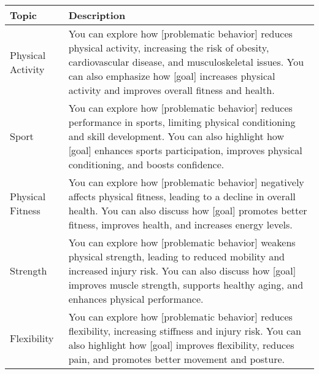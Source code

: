 \begin{table*}[tb]
\centering
\begin{tabularx}{\textwidth}{lX}
\toprule
Topic            & Description                                            \\ \midrule
Physical Activity           & You can explore how [problematic behavior] reduces physical activity, increasing the risk of obesity, cardiovascular disease, and musculoskeletal issues. You can also emphasize how [goal] increases physical activity and improves overall fitness and health.                                                                                                                                                                   \\ \hline
Sport                       & You can explore how [problematic behavior] reduces performance in sports, limiting physical conditioning and skill development. You can also highlight how [goal] enhances sports participation, improves physical conditioning, and boosts confidence.                                                                                                                                                                            \\ \hline
Physical Fitness            & You can explore how [problematic behavior] negatively affects physical fitness, leading to a decline in overall health. You can also discuss how [goal] promotes better fitness, improves health, and increases energy levels.                                                                                                                                                                                                     \\ \hline
Strength                    & You can explore how [problematic behavior] weakens physical strength, leading to reduced mobility and increased injury risk. You can also discuss how [goal] improves muscle strength, supports healthy aging, and enhances physical performance.                                                                                                                                                                                  \\ \hline
Flexibility                 & You can explore how [problematic behavior] reduces flexibility, increasing stiffness and injury risk. You can also highlight how [goal] improves flexibility, reduces pain, and promotes better movement and posture.                                                                                                                                                                                                              \\ \hline

\end{tabularx}
\end{table*}

